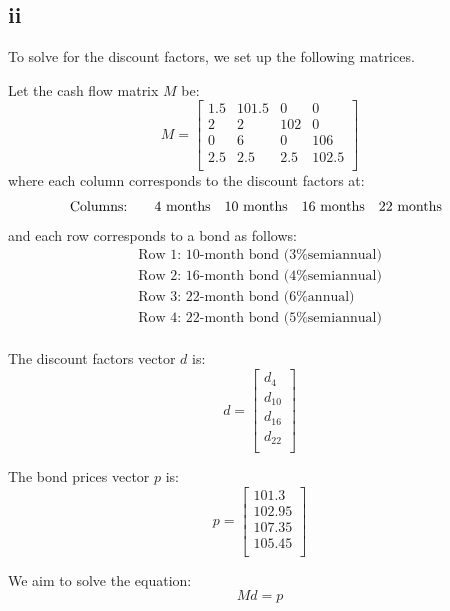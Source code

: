 \documentclass{article}
\begin{document}
\subsection*{ii}
To solve for the discount factors, we set up the following matrices.

Let the cash flow matrix \( M \) be:
\[
    M = \begin{bmatrix}
        1.5 & 101.5 & 0   & 0     \\
        2   & 2     & 102 & 0     \\
        0   & 6     & 0   & 106   \\
        2.5 & 2.5   & 2.5 & 102.5 \\
    \end{bmatrix}
\]
where each column corresponds to the discount factors at:
\[
    \text{Columns: } \quad
    \begin{array}{c c c c}
        \text{4 months} & \text{10 months} & \text{16 months} & \text{22 months}
    \end{array}
\]
and each row corresponds to a bond as follows:
\[
    \begin{array}{l}
        \text{Row 1: 10-month bond (3\% semiannual)} \\
        \text{Row 2: 16-month bond (4\% semiannual)} \\
        \text{Row 3: 22-month bond (6\% annual)}     \\
        \text{Row 4: 22-month bond (5\% semiannual)} \\
    \end{array}
\]

The discount factors vector \( d \) is:
\[
    d = \begin{bmatrix}
        d_{4}  \\
        d_{10} \\
        d_{16} \\
        d_{22} \\
    \end{bmatrix}
\]

The bond prices vector \( p \) is:
\[
    p = \begin{bmatrix}
        101.3  \\
        102.95 \\
        107.35 \\
        105.45 \\
    \end{bmatrix}
\]

We aim to solve the equation:
\[
    M d = p
\]
\end{document}
